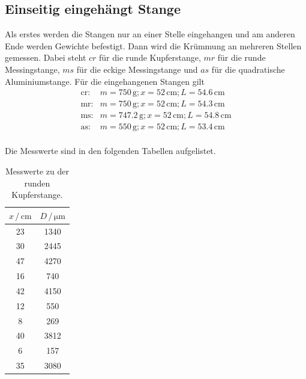 \subsection{Einseitig eingehängt Stange}
Als erstes werden die Stangen nur an einer Stelle eingehangen und am anderen Ende werden Gewichte befestigt. Dann wird die Krümmung an mehreren Stellen gemessen.
 Dabei steht $cr$ für die runde Kupferstange, $mr$ für die runde Messingstange, $ms$ für die eckige Messingstange und $as$ für die
quadratische Aluminiumstange.
Für die eingehangenen Stangen gilt
\begin{align*}
\text{cr}:& m = 750 \, \si{\gram};  x = 52 \, \si{\centi\meter}; L = 54.6 \, \si{\centi\meter} \\
\text{mr}:& m = 750 \, \si{\gram};  x = 52 \, \si{\centi\meter}; L = 54.3 \, \si{\centi\meter} \\
\text{ms}:& m = 747.2 \, \si{\gram};x = 52 \, \si{\centi\meter}; L = 54.8 \, \si{\centi\meter} \\
\text{as}:& m = 550 \, \si{\gram};  x = 52 \, \si{\centi\meter}; L =  53.4 \, \si{\centi\meter} \\
\end{align*}

\noindent
Die Messwerte sind in den folgenden Tabellen aufgelistet.

\begin{table}
	\centering
	\caption{Messwerte zu der runden Kupferstange.} 
	\label{tab:vana} 
	\begin{tabular}{c c}
	\toprule
	$x \, / \, \si{\centi\meter}$ & $D \, / \, \si{\micro\meter}$\\
	\midrule
    23     &     1340\\
    30     &     2445\\
    47     &     4270\\
    16     &      740\\
    42     &     4150\\
    12     &      550\\
    8      &      269\\
    40     &     3812\\
    6      &      157\\
    35     &     3080\\
\bottomrule
	\end{tabular}
\end{table}

